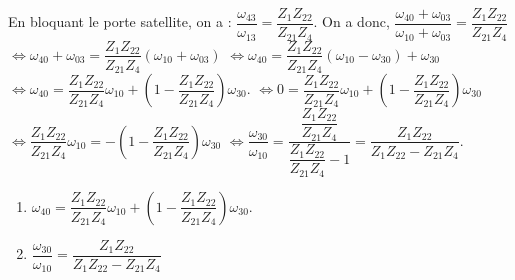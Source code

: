 \begin{corrigebox}
En bloquant le porte satellite, on a : $\dfrac{\omega_{43}}{\omega_{13}}=\dfrac{Z_{1}Z_{22}}{Z_{21}Z_{4}}$.
  On a donc, 
  $\dfrac{\omega_{40}+\omega_{03}}{\omega_{10}+\omega_{03}}=
\dfrac{Z_{1}Z_{22}}{Z_{21}Z_{4}}$
  $\Leftrightarrow \omega_{40}+\omega_{03}=\dfrac{Z_{1}Z_{22}}{Z_{21}Z_{4}}\left( \omega_{10}+\omega_{03} \right)$
  $\Leftrightarrow \omega_{40}=\dfrac{Z_{1}Z_{22}}{Z_{21}Z_{4}}\left( \omega_{10}-\omega_{30} \right) + \omega_{30}$
 $\Leftrightarrow \omega_{40}=\dfrac{Z_{1}Z_{22}}{Z_{21}Z_{4}}\omega_{10} +\left(1- \dfrac{Z_{1}Z_{22}}{Z_{21}Z_{4}}\right)\omega_{30}$.
$\Leftrightarrow 0=\dfrac{Z_{1}Z_{22}}{Z_{21}Z_{4}}\omega_{10} +\left(1- \dfrac{Z_{1}Z_{22}}{Z_{21}Z_{4}}\right)\omega_{30}$
$\Leftrightarrow  \dfrac{Z_{1}Z_{22}}{Z_{21}Z_{4}}\omega_{10} =-\left(1- \dfrac{Z_{1}Z_{22}}{Z_{21}Z_{4}}\right)\omega_{30}$
$\Leftrightarrow  \dfrac{\omega_{30}}{\omega_{10}} = \dfrac{ \dfrac{Z_{1}Z_{22}}{Z_{21}Z_{4}}}{ \dfrac{Z_{1}Z_{22}}{Z_{21}Z_{4}}-1}= \dfrac{ {Z_{1}Z_{22}}}{ {Z_{1}Z_{22}}-Z_{21}Z_{4}}$.

\begin{enumerate}
\item $\omega_{40}=\dfrac{Z_{1}Z_{22}}{Z_{21}Z_{4}}\omega_{10} +\left(1- \dfrac{Z_{1}Z_{22}}{Z_{21}Z_{4}}\right)\omega_{30}$.
\item $\dfrac{\omega_{30}}{\omega_{10}} = \dfrac{ {Z_{1}Z_{22}}}{ {Z_{1}Z_{22}}-Z_{21}Z_{4}}$
\end{enumerate}
\end{corrigebox}
